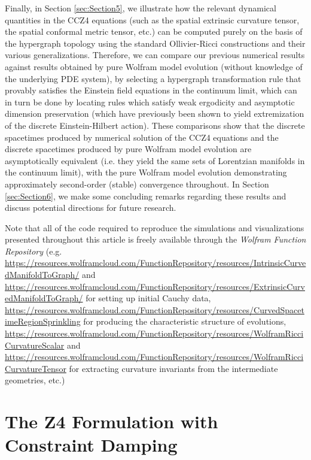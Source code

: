 \documentclass{article}
\begin{document}
Finally, in Section \ref{sec:Section5}, we illustrate how the relevant dynamical quantities in the CCZ4 equations (such as the spatial extrinsic curvature tensor, the spatial conformal metric tensor, etc.) can be computed purely on the basis of the hypergraph topology using the standard Ollivier-Ricci constructions and their various generalizations. Therefore, we can compare our previous numerical results against results obtained by pure Wolfram model evolution (without knowledge of the underlying PDE system), by selecting a hypergraph transformation rule that provably satisfies the Einstein field equations in the continuum limit, which can in turn be done by locating rules which satisfy weak ergodicity and asymptotic dimension preservation (which have previously been shown to yield extremization of the discrete Einstein-Hilbert action). These comparisons show that the discrete spacetimes produced by numerical solution of the CCZ4 equations and the discrete spacetimes produced by pure Wolfram model evolution are asymptotically equivalent (i.e. they yield the same sets of Lorentzian manifolds in the continuum limit), with the pure Wolfram model evolution demonstrating approximately second-order (stable) convergence throughout. In Section \ref{sec:Section6}, we make some concluding remarks regarding these results and discuss potential directions for future research.

Note that all of the code required to reproduce the simulations and visualizations presented throughout this article is freely available through the \textit{Wolfram Function Repository} (e.g. \url{https://resources.wolframcloud.com/FunctionRepository/resources/IntrinsicCurvedManifoldToGraph/} and \url{https://resources.wolframcloud.com/FunctionRepository/resources/ExtrinsicCurvedManifoldToGraph/} for setting up initial Cauchy data, \url{https://resources.wolframcloud.com/FunctionRepository/resources/CurvedSpacetimeRegionSprinkling} for producing the characteristic structure of evolutions, \url{https://resources.wolframcloud.com/FunctionRepository/resources/WolframRicciCurvatureScalar} and \url{https://resources.wolframcloud.com/FunctionRepository/resources/WolframRicciCurvatureTensor} for extracting curvature invariants from the intermediate geometries, etc.)

\section{The Z4 Formulation with Constraint Damping}
\label{sec:Section1}
\end{document}
